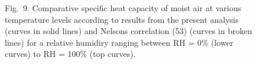\documentclass[11pt]{article}
\begin{document}
\begin{figure}[htbp]\centering
\caption*{Fig.~9. Comparative specific heat capacity of moist air at
various temperature levels according to results from the present
analysis (curves in solid lines) and Nelsons correlation (53) (curves
in broken lines) for a relative humidiry ranging between RH = 0\%
(lower curves) to RH = 100\% (top curves).}
\end{figure}

\end{document}
